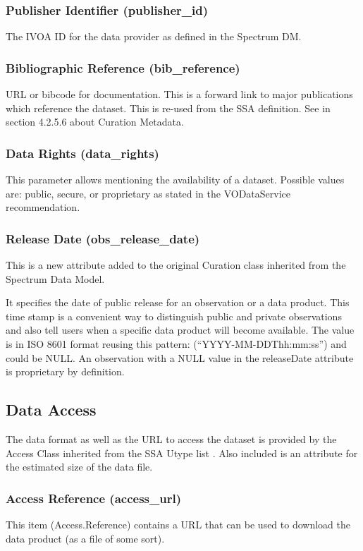 \documentclass[11pt,a4paper]{ivoa}
\begin{document}
\subsubsection{Publisher Identifier (publisher\_id)}
The IVOA ID for the data provider as defined in the Spectrum DM. 

\subsubsection{Bibliographic Reference (bib\_reference)}
URL or bibcode for documentation. This is a forward link to major publications which reference the dataset.  This is
re-used from the SSA definition. See \cite{2012ivoa.spec.0210T}  in section 4.2.5.6 about Curation Metadata.

\subsubsection{Data Rights (data\_rights)}
This parameter allows mentioning the availability of a dataset.  Possible values are: public, secure, or proprietary as
stated in the VODataService recommendation\cite{2010ivoa.spec.1202P}. 

\subsubsection{Release Date (obs\_release\_date)}
This is a new attribute added to the original Curation class inherited from the Spectrum Data Model. 

It specifies the date of public release for an observation or a data product. This time stamp is a convenient way to
distinguish public and private observations and also tell users when a specific data product will become available. The
value is in ISO 8601 format reusing this pattern: (``YYYY-MM-DDThh:mm:ss{}'') and could be NULL. An observation with a
NULL value in the releaseDate attribute is proprietary by definition.

\subsection{Data Access}
The data format as well as the URL to access the dataset is provided by the Access Class inherited from the SSA Utype
list \cite{2012ivoa.spec.0210T}. Also included is an attribute for the estimated size of the data file. 

\subsubsection{Access Reference (access\_url)}
This item (Access.Reference) contains a URL that can be used to download the data product (as a file of some sort).
\end{document}
